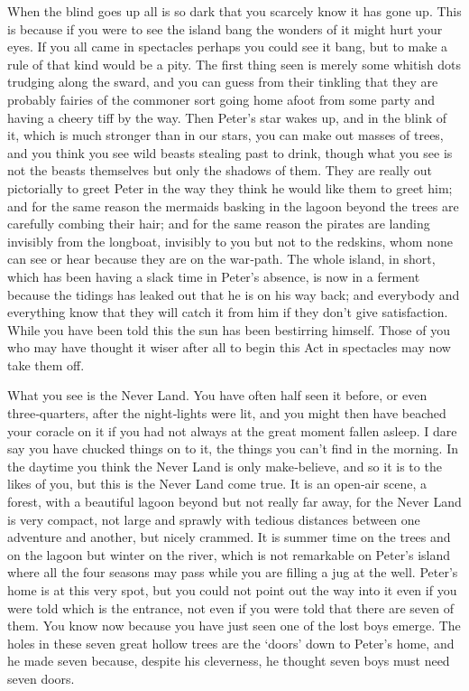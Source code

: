 

\begin{Settings}
When the blind goes up all is so dark that you scarcely know it has gone up.
This is because if you were to see the island bang
the wonders of it might hurt your eyes.
If you all came in spectacles perhaps you could see it bang,
but to make a rule of that kind would be a pity.
The first thing seen is merely some whitish dots trudging along the sward,
and you can guess from their tinkling that they are probably fairies of the commoner sort
going home afoot from some party and having a cheery tiff by the way.
Then Peter’s star wakes up,
and in the blink of it, which is much stronger than in our stars, you can make out masses of trees,
and you think you see wild beasts stealing past to drink,
though what you see is not the beasts themselves but only the shadows of them.
They are really out pictorially to greet Peter in the way they think he would like them to greet him;
and for the same reason the mermaids basking in the lagoon beyond the trees are carefully combing their hair;
and for the same reason the pirates are landing invisibly from the longboat,
invisibly to you but not to the redskins, whom none can see or hear because they are on the war‐path.
The whole island, in short, which has been having a slack time in Peter’s absence,
is now in a ferment because the tidings has leaked out that he is on his way back;
and everybody and everything know that they will catch it from him if they don’t give satisfaction.
While you have been told this the sun
has been bestirring himself.
Those of you who may have thought it wiser after all to begin this Act in spectacles may now take them off.

What you see is the Never Land.
You have often half seen it before, or even three‐quarters, after the night‐lights were lit,
and you might then have beached your coracle on it if you had not always at the great moment fallen asleep.
I dare say you have chucked things on to it, the things you can’t find in the morning.
In the daytime you think the Never Land is only make‐believe, and so it is to the likes of you,
but this is the Never Land come true.
It is an open‐air scene, a forest,
with a beautiful lagoon beyond but not really far away, for the Never Land is very compact,
not large and sprawly with tedious distances between one adventure and another, but nicely crammed.
It is summer time on the trees and on the lagoon but winter on the river,
which is not remarkable on Peter’s island where all the four seasons may pass while you are filling a jug at the well.
Peter’s home is at this very spot,
but you could not point out the way into it even if you were told which is the entrance,
not even if you were told that there are seven of them.
You know now because you have just seen one of the lost boys emerge.
The holes in these seven great hollow trees are the ‘doors’ down to Peter’s home,
and he made seven because, despite his cleverness, he thought seven boys must need seven doors.


\end{Settings}
